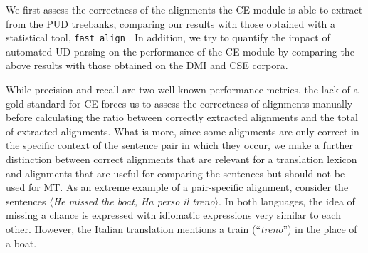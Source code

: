 \documentclass[11pt]{article}
\begin{document}
We first assess the correctness of the alignments the CE module is able to extract from the PUD treebanks, comparing our results with those obtained with a statistical tool, \texttt{fast\_align} \cite{dyer-etal-2013-simple}. 
In addition, we try to quantify the impact of automated UD parsing on the performance of the CE module by comparing the above results with those obtained on the DMI and CSE corpora.

While precision and recall are two well-known performance metrics, the lack of a gold standard for CE forces us to assess the correctness of alignments manually before calculating the ratio between correctly extracted alignments and the total of extracted alignments.
What is more, since some alignments are only correct in the specific context of the sentence pair in which they occur, we make a further distinction between correct alignments that are relevant for a translation lexicon and alignments that are useful for comparing the sentences but should not be used for MT. 
As an extreme example of a pair-specific alignment, consider the sentences $\langle$\textit{He missed the boat, Ha perso il treno}$\rangle$. 
In both languages, the idea of missing a chance is expressed with idiomatic expressions very similar to each other. 
However, the Italian translation mentions a train (``\textit{treno}'') in the place of a boat.
\end{document}
